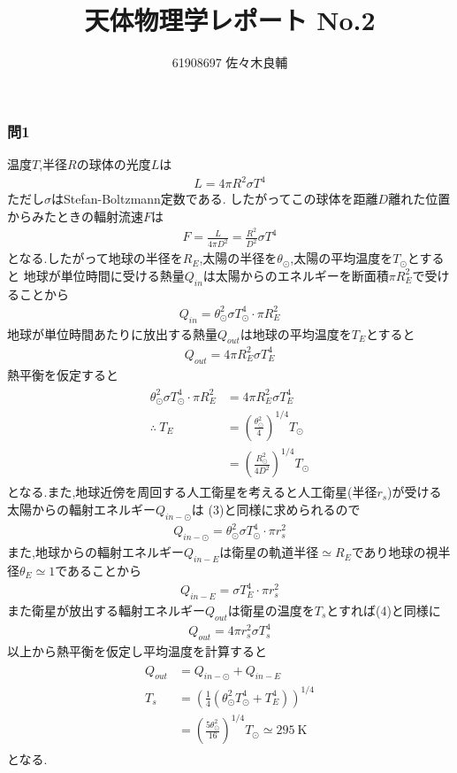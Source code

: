 \documentclass[uplatex,a4j,11pt,dvipdfmx]{jsarticle}
\begin{document}
\title{天体物理学レポート No.2}
\author{61908697 佐々木良輔}
\date{}
\maketitle
\subsubsection*{問1}
温度$T$,半径$R$の球体の光度$L$は
\begin{align}
  L=4\pi R^2\sigma T^4
\end{align}
ただし$\sigma$はStefan-Boltzmann定数である.
したがってこの球体を距離$D$離れた位置からみたときの輻射流速$F$は
\begin{align}
  F=\frac{L}{4\pi D^2}=\frac{R^2}{D^2}\sigma T^4
\end{align}
となる.したがって地球の半径を$R_E$,太陽の半径を$\theta_\odot$,太陽の平均温度を$T_\odot$とすると
地球が単位時間に受ける熱量$Q_{in}$は太陽からのエネルギーを断面積$\pi R_E^2$で受けることから
\begin{align}
  Q_{in}=\theta_\odot^2\sigma T_\odot^4\cdot \pi R_E^2
\end{align}
地球が単位時間あたりに放出する熱量$Q_{out}$は地球の平均温度を$T_E$とすると
\begin{align}
  Q_{out}=4\pi R_E^2\sigma T_E^4
\end{align}
熱平衡を仮定すると
\begin{align}
  \begin{split}
    \theta_\odot^2\sigma T_\odot^4\cdot \pi R_E^2&=4\pi R_E^2\sigma T_E^4\\
    \therefore\ T_E&=\left(\frac{\theta_\odot^2}{4}\right)^{1/4}T_\odot\\
    &=\left(\frac{R_\odot^2}{4D^2}\right)^{1/4}T_\odot
  \end{split}
\end{align}
となる.また,地球近傍を周回する人工衛星を考えると人工衛星(半径$r_s$)が受ける太陽からの輻射エネルギー$Q_{in-\odot}$は
(3)と同様に求められるので
\begin{align}
  Q_{in-\odot}=\theta_\odot^2\sigma T_\odot^4\cdot\pi r_s^2
\end{align}
また,地球からの輻射エネルギー$Q_{in-E}$は衛星の軌道半径$\simeq R_E$であり地球の視半径$\theta_E\simeq 1$であることから
\begin{align}
  Q_{in-E}=\sigma T_E^4\cdot\pi r_s^2
\end{align}
また衛星が放出する輻射エネルギー$Q_{out}$は衛星の温度を$T_s$とすれば(4)と同様に
\begin{align}
  Q_{out}=4\pi r_s^2\sigma T_s^4
\end{align}
以上から熱平衡を仮定し平均温度を計算すると
\begin{align}
  \begin{split}
    Q_{out}&=Q_{in-\odot}+Q_{in-E}\\
    T_s&=\left(\frac{1}{4}(\theta_\odot^2 T_\odot^4+T_E^4)\right)^{1/4}\\
    &=\left(\frac{5\theta_\odot^2}{16}\right)^{1/4}T_\odot\simeq 295\ \si{\kelvin}
  \end{split}
\end{align}
となる.
\end{document}
